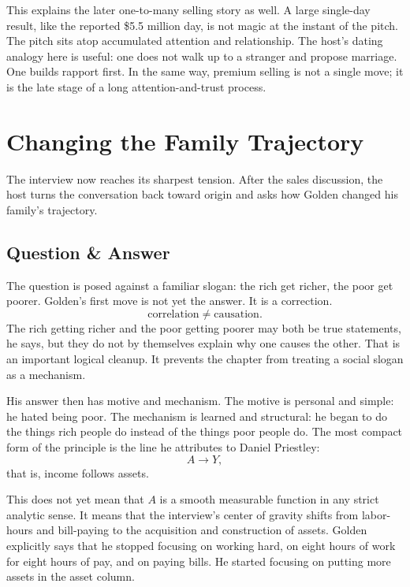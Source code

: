 This explains the later one-to-many selling story as well. A large single-day result, like the reported \$5.5 million day, is not magic at the instant of the pitch. The pitch sits atop accumulated attention and relationship. The host's dating analogy here is useful: one does not walk up to a stranger and propose marriage. One builds rapport first. In the same way, premium selling is not a single move; it is the late stage of a long attention-and-trust process.

\section{Changing the Family Trajectory}

The interview now reaches its sharpest tension. After the sales discussion, the host turns the conversation back toward origin and asks how Golden changed his family's trajectory.

\subsection{Question \& Answer}

The question is posed against a familiar slogan: the rich get richer, the poor get poorer. Golden's first move is not yet the answer. It is a correction.
\begin{equation}
\text{correlation} \neq \text{causation}.
\end{equation}
The rich getting richer and the poor getting poorer may both be true statements, he says, but they do not by themselves explain why one causes the other. That is an important logical cleanup. It prevents the chapter from treating a social slogan as a mechanism.

His answer then has motive and mechanism. The motive is personal and simple: he hated being poor. The mechanism is learned and structural: he began to do the things rich people do instead of the things poor people do. The most compact form of the principle is the line he attributes to Daniel Priestley:
\begin{equation}
A \rightarrow Y,
\end{equation}
that is, income follows assets.

This does not yet mean that \(A\) is a smooth measurable function in any strict analytic sense. It means that the interview's center of gravity shifts from labor-hours and bill-paying to the acquisition and construction of assets. Golden explicitly says that he stopped focusing on working hard, on eight hours of work for eight hours of pay, and on paying bills. He started focusing on putting more assets in the asset column.

